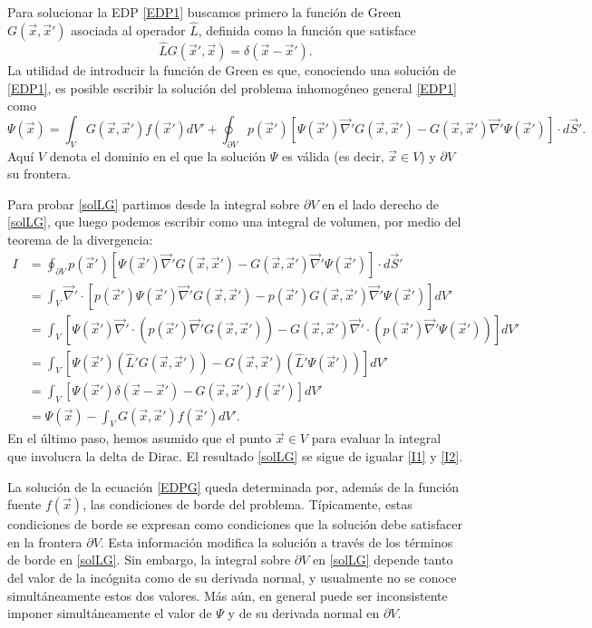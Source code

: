 Para solucionar la EDP \eqref{EDP1} buscamos primero la función de Green $G(\vec{x},\vec{x}')$ asociada al operador $\hat L$, definida como la función que satisface
\begin{equation}\label{EDPG}
\hat{L}G(\vec{x}',\vec{x})=\delta(\vec{x}-\vec{x}').
\end{equation}
La utilidad de introducir la función de Green es que, conociendo una solución de \eqref{EDP1}, es posible escribir la solución del problema inhomogéneo general \eqref{EDP1} como
\begin{equation}\label{solLG}
\boxed{\Psi(\vec{x})=\int_VG(\vec{x},\vec{x}')f(\vec{x}')dV'+\oint_{\partial V}p(\vec{x}')\left[\Psi(\vec{x}')\vec\nabla' G(\vec{x},\vec{x}')
-G(\vec{x},\vec{x}')\vec\nabla'\Psi(\vec{x}')\right]\cdot d\vec{S}'.}
\end{equation}
Aquí $V$ denota el dominio en el que la solución $\Psi$ es válida (es decir, $\vec{x}\in V$) y  $\partial V$ su frontera.

Para probar \eqref{solLG} partimos desde la integral sobre $\partial V$ en el lado derecho de \eqref{solLG}, que luego podemos escribir como una integral de volumen, por medio del teorema de la divergencia:
\begin{align}
I &= \oint_{\partial V}p(\vec{x}')\left[\Psi(\vec{x}')\vec\nabla'G(\vec{x},\vec{x}')
-G(\vec{x},\vec{x}')\vec\nabla'\Psi(\vec{x}')\right]\cdot d\vec{S}' \label{I1}\\
&= \int_V\vec\nabla'\cdot\left[p(\vec{x}')\Psi(\vec{x}')\vec\nabla'G(\vec{x},\vec{x}')
-p(\vec{x}')G(\vec{x},\vec{x}')\vec\nabla'\Psi(\vec{x}')\right]dV' \\
&= \int_V\left[\Psi(\vec{x}')\vec\nabla'\cdot\left(p(\vec{x}')\vec\nabla' G(\vec{x},\vec{x}')\right) 
-G(\vec{x},\vec{x}')\vec\nabla'\cdot\left(p(\vec{x}')\vec\nabla'\Psi(\vec{x}')\right)\right]dV' \\
&= \int_V\left[\Psi(\vec{x}')\left(\hat{L}'G(\vec{x},\vec{x}')\right) 
-G(\vec{x},\vec{x}')\left(\hat{L}'\Psi(\vec{x}')\right)\right]dV' \\
&= \int_V\left[\Psi(\vec{x}')\delta(\vec{x}-\vec{x}')
-G(\vec{x},\vec{x}')f(\vec{x}')\right]dV' \\
&= \Psi(\vec{x})- \int_VG(\vec{x},\vec{x}')f(\vec{x}')dV'. \label{I2}
\end{align}
En el último paso, hemos asumido que el punto $\vec{x}\in V$  para evaluar la integral que involucra la delta de Dirac. El resultado \eqref{solLG} se sigue de igualar \eqref{I1} y \eqref{I2}.

La solución de la ecuación \eqref{EDPG} queda determinada por, además de la función fuente $f(\vec{x})$, las condiciones de borde del problema. Típicamente, estas condiciones de borde se expresan como condiciones que la solución debe satisfacer en la frontera $\partial V$. Esta información modifica la solución a través de los términos de borde en \eqref{solLG}. Sin embargo, la integral sobre $\partial V$ en \eqref{solLG} depende tanto del valor de la incógnita como de su derivada normal, y usualmente no se conoce simultáneamente estos dos valores. Más aún, en general puede ser inconsistente imponer simultáneamente el valor de $\Psi$ y de su derivada normal en $\partial V$.

